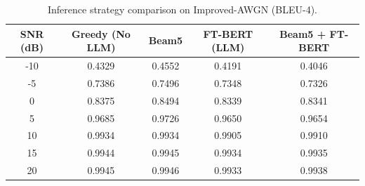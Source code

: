 \begin{table}[htbp]
\centering
\caption{Inference strategy comparison on Improved-AWGN (BLEU-4).}
\begin{tabular}{ccccc}
\toprule
SNR (dB) & Greedy (No LLM) & Beam5 & FT-BERT (LLM) & Beam5 + FT-BERT \\
\midrule
-10 & 0.4329 & 0.4552 & 0.4191 & 0.4046 \\
-5  & 0.7386 & 0.7496 & 0.7348 & 0.7326 \\
0   & 0.8375 & 0.8494 & 0.8339 & 0.8341 \\
5   & 0.9685 & 0.9726 & 0.9650 & 0.9654 \\
10  & 0.9934 & 0.9934 & 0.9905 & 0.9910 \\
15  & 0.9944 & 0.9945 & 0.9934 & 0.9935 \\
20  & 0.9945 & 0.9946 & 0.9933 & 0.9938 \\
\bottomrule
\end{tabular}
\label{tab:strategy}
\end{table}

